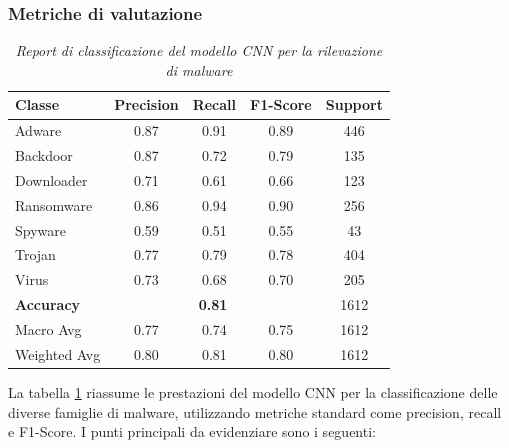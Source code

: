 \subsubsection{Metriche di valutazione}
\begin{table}[ht]
    \centering
    \begin{tabular}{@{}|lcccc|@{}}
    \toprule
    \textbf{Classe}      & \textbf{Precision} & \textbf{Recall} & \textbf{F1-Score} & \textbf{Support} \\ \midrule
    Adware          & 0.87               & 0.91            & 0.89              & 446              \\
    Backdoor        & 0.87               & 0.72            & 0.79              & 135              \\
    Downloader      & 0.71               & 0.61            & 0.66              & 123              \\
    Ransomware      & 0.86               & 0.94            & 0.90              & 256              \\
    Spyware         & 0.59               & 0.51            & 0.55              & 43               \\
    Trojan          & 0.77               & 0.79            & 0.78              & 404              \\
    Virus           & 0.73               & 0.68            & 0.70              & 205              \\ \midrule
    \textbf{Accuracy}      & \multicolumn{3}{c}{\textbf{0.81}}         & 1612             \\ \midrule
    Macro Avg       & 0.77               & 0.74            & 0.75              & 1612             \\
    Weighted Avg    & 0.80               & 0.81            & 0.80              & 1612             \\ \bottomrule
    \end{tabular}
    \vspace{.2cm}
    \caption{\emph{Report di classificazione del modello CNN per la rilevazione di malware}}
    \label{tab:report_2_esperimento}
\end{table}
La tabella \ref{tab:report_2_esperimento} riassume le prestazioni del modello CNN per la classificazione delle diverse famiglie di malware, utilizzando metriche standard come precision, recall e F1-Score. I punti principali da evidenziare sono i seguenti:
